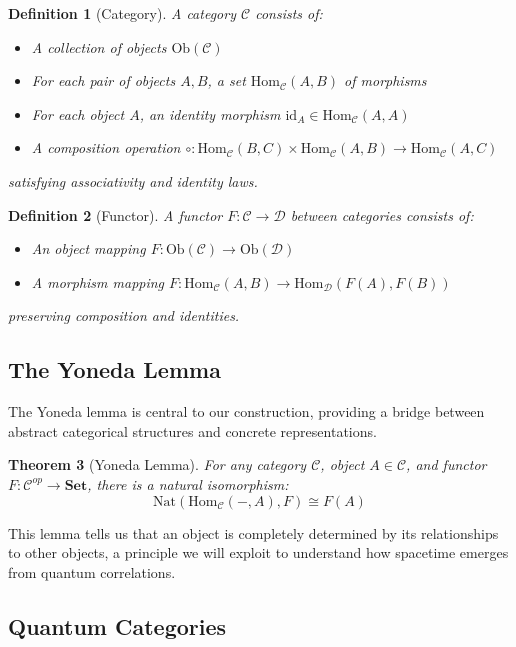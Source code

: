 \documentclass[11pt,a4paper]{article}
\newtheorem{theorem}{Theorem}[section]
\newtheorem{definition}[theorem]{Definition}
\newcommand{\Cat}[1]{\mathbf{#1}}
\newcommand{\Hom}{\text{Hom}}
\newcommand{\id}{\text{id}}
\newcommand{\Set}{\Cat{Set}}
\begin{document}
\begin{definition}[Category]
A category $\mathcal{C}$ consists of:
\begin{itemize}
\item A collection of objects $\text{Ob}(\mathcal{C})$
\item For each pair of objects $A, B$, a set $\Hom_{\mathcal{C}}(A, B)$ of morphisms
\item For each object $A$, an identity morphism $\id_A \in \Hom_{\mathcal{C}}(A, A)$
\item A composition operation $\circ: \Hom_{\mathcal{C}}(B, C) \times \Hom_{\mathcal{C}}(A, B) \to \Hom_{\mathcal{C}}(A, C)$
\end{itemize}
satisfying associativity and identity laws.
\end{definition}

\begin{definition}[Functor]
A functor $F: \mathcal{C} \to \mathcal{D}$ between categories consists of:
\begin{itemize}
\item An object mapping $F: \text{Ob}(\mathcal{C}) \to \text{Ob}(\mathcal{D})$
\item A morphism mapping $F: \Hom_{\mathcal{C}}(A, B) \to \Hom_{\mathcal{D}}(F(A), F(B))$
\end{itemize}
preserving composition and identities.
\end{definition}

\subsection{The Yoneda Lemma}

The Yoneda lemma is central to our construction, providing a bridge between abstract categorical structures and concrete representations.

\begin{theorem}[Yoneda Lemma]
For any category $\mathcal{C}$, object $A \in \mathcal{C}$, and functor $F: \mathcal{C}^{op} \to \Set$, there is a natural isomorphism:
\[
\text{Nat}(\Hom_{\mathcal{C}}(-, A), F) \cong F(A)
\]
\end{theorem}

This lemma tells us that an object is completely determined by its relationships to other objects, a principle we will exploit to understand how spacetime emerges from quantum correlations.

\subsection{Quantum Categories}
\end{document}
